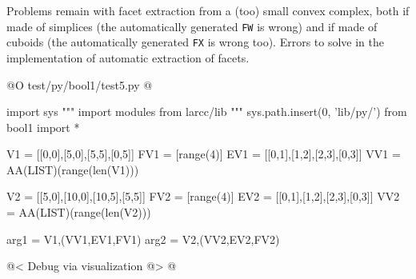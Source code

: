 \documentclass[11pt,oneside]{article}	%
\begin{document}
Problems remain with facet extraction from a (too) small convex complex, both if made of simplices
(the automatically generated \texttt{FW} is wrong) and if made of cuboids
(the automatically generated \texttt{FX} is wrong too). Errors to solve in the implementation of automatic extraction of facets.

@O test/py/bool1/test5.py
@{
import sys
""" import modules from larcc/lib """
sys.path.insert(0, 'lib/py/')
from bool1 import *

V1 = [[0,0],[5,0],[5,5],[0,5]]
FV1 = [range(4)]
EV1 = [[0,1],[1,2],[2,3],[0,3]]
VV1 = AA(LIST)(range(len(V1)))

V2 = [[5,0],[10,0],[10,5],[5,5]]
FV2 = [range(4)]
EV2 = [[0,1],[1,2],[2,3],[0,3]]
VV2 = AA(LIST)(range(len(V2)))

arg1 = V1,(VV1,EV1,FV1)
arg2 = V2,(VV2,EV2,FV2)

@< Debug via visualization @>
@}
\end{document}
